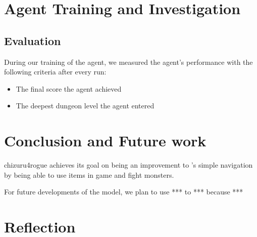 \documentclass[11pt,a4paper]{article}
\begin{document}
\section{Agent Training and Investigation}
\subsection{Evaluation}
During our training of the agent, we measured the agent's performance with the following criteria after every run:
\begin{itemize}
    \item The final score the agent achieved
    \item The deepest dungeon level the agent entered
\end{itemize}

\section{Conclusion and Future work}
chizuru4rogue achieves its goal on being an improvement to \cite{asperti18}'s simple navigation by being able to use items in game and fight monsters.

For future developments of the model, we plan to use *** to *** because ***

\section{Reflection}

\medskip



\end{document}
